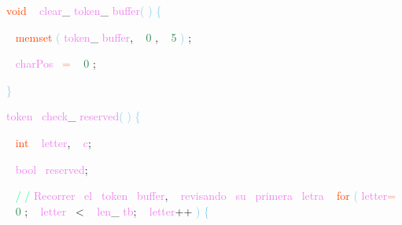 \documentclass[8, usernames, dvipsnames]{beamer}
\begin{document}
\begin{frame}
\textcolor{OrangeRed}{void}
\textcolor{White}{\ }
\textcolor{Violet}{clear}\textcolor{Sepia}{\_}
\textcolor{Violet}{token}\textcolor{Sepia}{\_}
\textcolor{Violet}{buffer}\textcolor{SkyBlue}{(}
\textcolor{SkyBlue}{)}
\textcolor{SkyBlue}{\{ }

 \textcolor{White}{\   }
\textcolor{OrangeRed}{memset}
\textcolor{SkyBlue}{(}
\textcolor{Violet}{token}\textcolor{Sepia}{\_}
\textcolor{Violet}{buffer}\textcolor{Sepia}{,}
\textcolor{White}{\ }
\textcolor{SeaGreen}{0}
\textcolor{Sepia}{,}
\textcolor{White}{\ }
\textcolor{SeaGreen}{5}
\textcolor{SkyBlue}{)}
\textcolor{Sepia}{;}

 \textcolor{White}{\   }
\textcolor{Violet}{charPos}\textcolor{White}{\ }
\textcolor{Salmon}{=}
\textcolor{White}{\ }
\textcolor{SeaGreen}{0}
\textcolor{Sepia}{;}

 \textcolor{SkyBlue}{\} }

 
 \textcolor{Violet}{token}\textcolor{White}{\ }
\textcolor{Violet}{check}\textcolor{Sepia}{\_}
\textcolor{Violet}{reserved}\textcolor{SkyBlue}{(}
\textcolor{SkyBlue}{)}
\textcolor{SkyBlue}{\{ }

 \textcolor{White}{\   }
\textcolor{OrangeRed}{int}
\textcolor{White}{\ }
\textcolor{Violet}{letter}\textcolor{Sepia}{,}
\textcolor{White}{\ }
\textcolor{Violet}{c}\textcolor{Sepia}{;}

 \textcolor{White}{\   }
\textcolor{Violet}{bool}\textcolor{White}{\ }
\textcolor{Violet}{reserved}\textcolor{Sepia}{;}

 \textcolor{White}{\   }
\textcolor{SpringGreen}{/}
\textcolor{SpringGreen}{/}
\textcolor{Violet}{Recorrer}\textcolor{White}{\ }
\textcolor{Violet}{el}\textcolor{White}{\ }
\textcolor{Violet}{token}\textcolor{White}{\ }
\textcolor{Violet}{buffer}\textcolor{Sepia}{,}
\textcolor{White}{\ }
\textcolor{Violet}{revisando}\textcolor{White}{\ }
\textcolor{Violet}{su}\textcolor{White}{\ }
\textcolor{Violet}{primera}\textcolor{White}{\ }
\textcolor{Violet}{letra}
 \textcolor{White}{\   }
\textcolor{OrangeRed}{for}
\textcolor{SkyBlue}{(}
\textcolor{Violet}{letter}\textcolor{Salmon}{=}
\textcolor{White}{\ }
\textcolor{SeaGreen}{0}
\textcolor{Sepia}{;}
\textcolor{White}{\ }
\textcolor{Violet}{letter}\textcolor{White}{\ }
\textcolor{OliveGreen}{\textless}
\textcolor{White}{\ }
\textcolor{Violet}{len}\textcolor{Sepia}{\_}
\textcolor{Violet}{tb}\textcolor{Sepia}{;}
\textcolor{White}{\ }
\textcolor{Violet}{letter}\textcolor{Apricot}{++}
\textcolor{SkyBlue}{)}
\textcolor{SkyBlue}{\{ }

 \end{frame}
\end{document}
